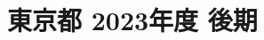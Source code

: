 \documentclass[../../hsm_tok_q.tex]{subfiles}
\begin{document}
    \section{東京都 2023年度 後期}
    \subsection{　}
    
    \newpage
    \subsection{　}
    
    \newpage
    \subsection{　}
    
    \newpage
    \subsection{　}
    
    \newpage
    \subsection{　}
    
\end{document}
